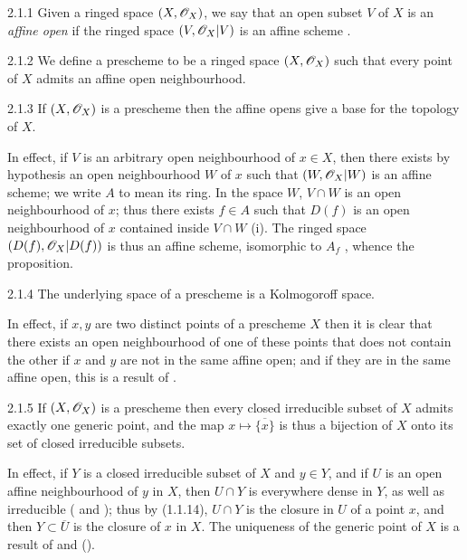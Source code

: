 \documentclass{book}
\begin{document}
\begin{env}{2.1.1}
\label{env-1.2.1.1}
Given a ringed space $(X,\mathscr{O}_X)$, we say that an open subset
$V$ of $X$ is an \emph{affine open} if the ringed space $(V,\mathscr{O}_X|V)$ is an
affine scheme .
\end{env}

\begin{env}[Definition]{2.1.2}
\label{defn-1.2.1.2}
We define a prescheme to be a ringed space
$(X,\mathscr{O}_X)$ such that every point of $X$ admits an affine open neighbourhood.
\end{env}

\begin{envs}[Proposition]{2.1.3}
\label{prop-2.1.3}
If $(X,\mathscr{O}_X)$ is a prescheme then
the affine opens give a base for the topology of $X$.
\end{envs}

In effect, if $V$ is an arbitrary open neighbourhood of $x\in X$, then there
exists by hypothesis an open neighbourhood $W$ of $x$ such that $(W,\mathscr{O}_X|W)$ is
an affine scheme; we write $A$ to mean its ring.  In the space $W$, $V\cap W$ is
an open neighbourhood of $x$; thus there exists $f\in A$ such that $D(f)$ is an
open neighbourhood of $x$ contained inside $V\cap W$  (i).  The ringed
space $(D(f),\mathscr{O}_X|D(f))$ is thus an affine scheme, isomorphic to $A_f$
, whence the proposition.

\begin{envs}[Proposition]{2.1.4}
\label{prop-1.2.1.4}
The underlying space of a prescheme is a Kolmogoroff space.
\end{envs}

In effect, if $x,y$ are two distinct points of a prescheme $X$ then it is clear
that there exists an open neighbourhood of one of these points that does not
contain the other if $x$ and $y$ are not in the same affine open; and if they
are in the same affine open, this is a result of .

\begin{envs}[Proposition]{2.1.5}
\label{prop-1.2.1.5}
If $(X,\mathscr{O}_X)$ is a prescheme then every closed
irreducible subset of $X$ admits exactly one generic point, and the map
$x\mapsto\overline{\{x\}}$ is thus a bijection of $X$ onto its set of closed
irreducible subsets.
\end{envs}

In effect, if $Y$ is a closed irreducible subset of $X$ and $y\in Y$, and if $U$
is an open affine neighbourhood of $y$ in $X$, then $U\cap Y$ is everywhere
dense in $Y$, as well as irreducible ( and ); thus by
(1.1.14), $U\cap Y$ is the closure in $U$ of a point $x$, and then
$Y\subset\overline{U}$ is the closure of $x$ in $X$.  The uniqueness of the
generic point of $X$ is a result of  and ().
\end{document}
